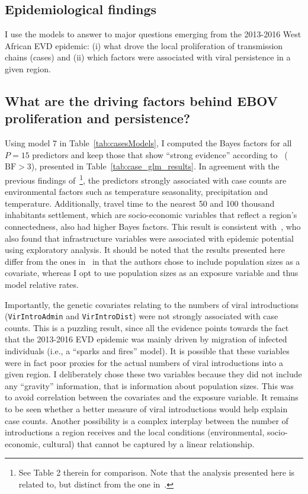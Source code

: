 \subsection*{Epidemiological findings}

I use the models to answer to major questions emerging from the 2013-2016 West African EVD epidemic: (i) what drove the local proliferation of transmission chains (cases) and (ii) which factors were associated with viral persistence in a given region.

\subsection*{What are the driving factors behind EBOV proliferation and persistence?}

Using model 7 in Table~\ref{tab:casesModels}, I computed the Bayes factors for all $P = 15$ predictors and keep those that show ``strong evidence'' according to~\cite{Kass1995} ($\text{BF}>3$), presented in Table~\ref{tab:case_glm_results}.
In agreement with the previous findings of~\cite{Dudas2017}\footnote{See Table 2 therein for comparison. Note that the analysis presented here is related to, but distinct from the one in~\cite{Dudas2017}.}, the predictors strongly associated with case counts are environmental factors such as temperature seasonality, precipitation and temperature.
Additionally, travel time to the nearest 50 and 100 thousand inhabitants settlement, which are socio-economic variables that reflect a region's connectedness, also had higher Bayes factors.
This result is consistent with~\cite{Suchar2018}, who also found that infrastructure variables were associated with epidemic potential using exploratory analysis.
It should be noted that the results presented here differ from the ones in~\cite{Dudas2017} in that the authors chose to include population sizes as a covariate, whereas I opt to use population sizes as an exposure variable and thus model relative rates.

Importantly, the genetic covariates relating to the numbers of viral introductions (\verb|VirIntroAdmin| and \verb|VirIntroDist|) were not strongly associated with case counts.
This is a puzzling result, since all the evidence points towards the fact that the 2013-2016 EVD epidemic was mainly driven by migration of infected individuals (i.e., a ``sparks and fires'' model).
It is possible that these variables were in fact poor proxies for the actual numbers of viral introductions into a given region.
I deliberately chose these two variables because they did not include any ``gravity'' information, that is information about population sizes.
This was to avoid correlation between the covariates and the exposure variable.
It remains to be seen whether a better measure of viral introductions would help explain case counts.
Another possibility is a complex interplay between the number of introductions a region receives and the local conditions (environmental, socio-economic, cultural) that cannot be captured by a linear relationship.

